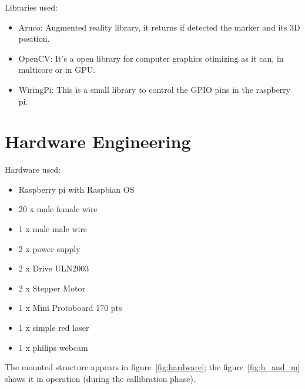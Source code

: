 \documentclass{article}
\begin{document}
Libraries used:
\begin{itemize}
    \item Aruco: Augmented reality library, it returns if detected the marker
        and its 3D position.
    \item OpenCV: It's a open library for computer graphics otimizing as it can,
        in multicore or in GPU. 
    \item WiringPi: This is a small library to control the GPIO pins in the
        raspberry pi.
\end{itemize}

\section{Hardware Engineering}

Hardware used:
\begin{itemize}
    \item Raspberry pi with Raspbian OS
    \item 20 x male female wire
    \item 1 x male male wire
    \item 2 x power supply
    \item 2 x Drive ULN2003
    \item 2 x Stepper Motor
    \item 1 x Mini Protoboard 170 pts
    \item 1 x simple red laser
    \item 1 x philips webcam
\end{itemize}

The mounted structure appears in figure~\ref{fig:hardware};
the figure~\ref{fig:h_and_m} shows it in operation
(during the callibration phase).
\end{document}
